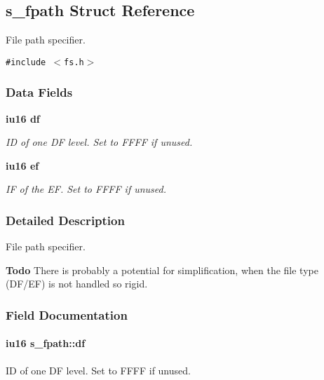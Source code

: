 \subsection{s\_\-fpath Struct Reference}
\label{structs__fpath}
File path specifier.  


{\tt \#include $<$fs.h$>$}

\subsubsection*{Data Fields}
\begin{CompactItemize}
\item 
\bf{iu16} \bf{df}
\begin{CompactList}\small\item\em ID of one DF level. Set to FFFF if unused. \item\end{CompactList}\item 
\bf{iu16} \bf{ef}
\begin{CompactList}\small\item\em IF of the EF. Set to FFFF if unused. \item\end{CompactList}\end{CompactItemize}


\subsubsection{Detailed Description}
File path specifier. 

\begin{Desc}
\item[\bf{Todo}]There is probably a potential for simplification, when the file type (DF/EF) is not handled so rigid. \end{Desc}




\subsubsection{Field Documentation}
\paragraph{\setlength{\rightskip}{0pt plus 5cm}\bf{iu16} \bf{s\_\-fpath::df}}\hfill\label{structs__fpath_a16acae1b4ba3966c13fe44b278ced64}


ID of one DF level. Set to FFFF if unused. 

